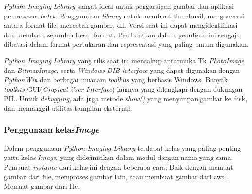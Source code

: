 \textit{Python Imaging Library} sangat ideal untuk pengarsipan gambar dan aplikasi pemrosesan \textit{batch}. Penggunakan \textit{library }untuk membuat thumbnail, mengonversi antara format file, mencetak gambar, dll. Versi saat ini dapat mengidentifikasi dan membaca sejumlah besar format. Pembantuan dalam penulisan ini sengaja dibatasi dalam format pertukaran dan representasi yang paling umum digunakan.

\textit{Python Imaging Library} yang rilis saat ini mencakup antarmuka Tk \textit{PhotoImage} dan \textit{BitmapImage}, serta \textit{Windows DIB interface} yang dapat digunakan dengan \textit{PythonWin} dan berbagai mnacam \textit{toolkits} yang berbasis Windows. Banyak \textit{toolkits} GUI(\textit{Grapical User Interface}) lainnya yang dilengkapi dengan dukungan PIL. Untuk \textit{debugging}, ada juga metode \textit{show()} yang menyimpan gambar ke disk, dan memanggil utilitas tampilan eksternal.

\subsubsection{Penggunaan kelas\textit{Image}}
Dalam penggunaan \textit{Python Imaging Library} terdapat kelas yang paling penting yaitu kelas \textit{Image}, yang didefinisikan dalam modul dengan nama yang sama. Pembuat \textit{instance} dari kelas ini dengan beberapa cara; Baik dengan memuat gambar dari file, memproses gambar lain, atau membuat gambar dari awal. Memuat gambar dari file. 

